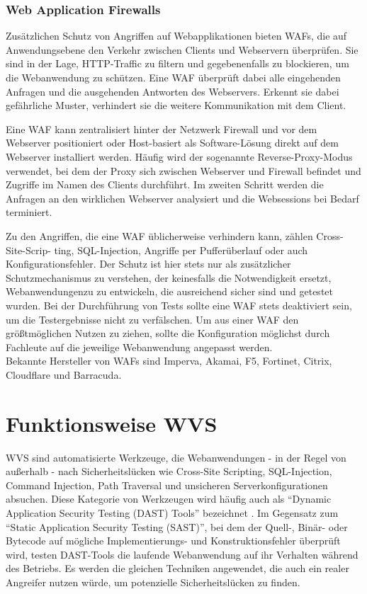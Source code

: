\documentclass[12pt,oneside,a4paper,parskip,pointlessnumbers]{scrbook}
\begin{document}
    \subsubsection{Web Application Firewalls}
    Zusätzlichen Schutz von Angriffen auf Webapplikationen bieten WAFs, die auf Anwendungsebene den Verkehr zwischen Clients und Webservern überprüfen. Sie sind in der Lage, HTTP-Traffic zu filtern und gegebenenfalls zu blockieren, um die Webanwendung zu schützen.
    Eine WAF überprüft dabei alle eingehenden Anfragen und die ausgehenden Antworten des Webservers.
    Erkennt sie dabei gefährliche Muster, verhindert sie die weitere Kommunikation mit dem Client.

    Eine WAF kann zentralisiert hinter der Netzwerk Firewall und vor dem Webserver positioniert oder Host-basiert als Software-Lösung direkt auf dem Webserver installiert werden.
    Häufig wird der sogenannte Reverse-Proxy-Modus verwendet, bei dem der Proxy sich zwischen Webserver und Firewall befindet und Zugriffe im Namen des Clients durchführt. Im zweiten Schritt werden die Anfragen an den wirklichen Webserver analysiert und die Websessions bei Bedarf terminiert.

    Zu den Angriffen, die eine WAF üblicherweise verhindern kann, zählen Cross-Site-Scrip- ting, SQL-Injection, Angriffe per Pufferüberlauf oder auch Konfigurationsfehler. Der Schutz ist hier stets nur als zusätzlicher Schutzmechanismus zu verstehen, der keinesfalls die Notwendigkeit ersetzt, Webanwendungenzu zu entwickeln, die ausreichend sicher sind und getestet wurden. Bei der Durchführung von Tests sollte eine WAF stets deaktiviert sein, um die Testergebnisse nicht zu verfälschen.
    Um aus einer WAF den größtmöglichen Nutzen zu ziehen, sollte die Konfiguration möglichst durch Fachleute
    auf die jeweilige Webanwendung angepasst werden. \cite{BSI,WAF}\\
    Bekannte Hersteller von WAFs sind Imperva, Akamai, F5, Fortinet, Citrix, Cloudflare und Barracuda.



    \newpage
  \section{Funktionsweise WVS}
  WVS sind automatisierte Werkzeuge, die Webanwendungen - in der Regel von außerhalb - nach Sicherheitslücken wie Cross-Site Scripting, SQL-Injection, Command Injection, Path Traversal und unsicheren Serverkonfigurationen absuchen. Diese Kategorie von Werkzeugen wird häufig auch als ``Dynamic Application Security Testing (DAST) Tools'' bezeichnet \cite{OWASPtools}. Im Gegensatz zum ``Static Application Security Testing (SAST)'', bei dem der Quell-, Binär- oder Bytecode auf mögliche Implementierungs- und Konstruktionsfehler überprüft wird, testen DAST-Tools die laufende Webanwendung auf ihr Verhalten während des Betriebs. Es werden die gleichen Techniken angewendet, die auch ein realer Angreifer nutzen würde, um potenzielle Sicherheitslücken zu finden.
\end{document}
